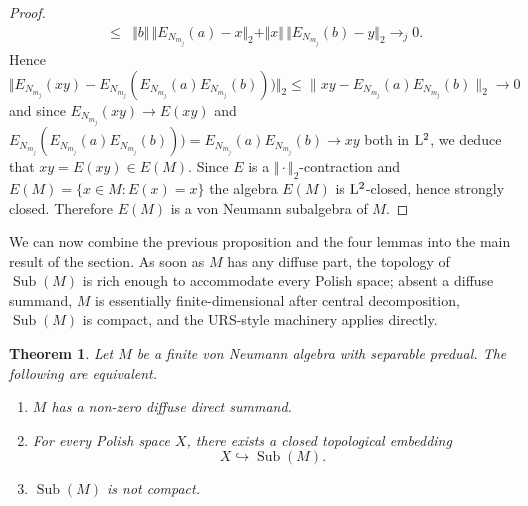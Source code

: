 \documentclass[12pt]{amsart} %
\theoremstyle{plain}
\newtheorem{theorem}{Theorem}[section]
\theoremstyle{definition}
\DeclareMathOperator{\Sub}{Sub}
\begin{document}
\begin{proof}
\begin{eqnarray*}
&\leq &\Vert b\Vert\,\Vert E_{N_{m_j}}(a)-x\Vert_2+\Vert x\Vert\,\Vert E_{N_{m_j}}(b)-y\Vert_2\to_j0.
\end{eqnarray*}
Hence $\Vert E_{N_{m_j}}(xy)-E_{N_{m_j}}(E_{N_{m_j}}(a)E_{N_{m_j}}(b)))\Vert_2\leq\|xy-E_{N_{m_j}}(a)E_{N_{m_j}}(b)\|_2\to 0$ and since $E_{N_{m_j}}(xy)\to E(xy)$ and $E_{N_{m_j}}(E_{N_{m_j}}(a)E_{N_{m_j}}(b)))=E_{N_{m_j}}(a)E_{N_{m_j}}(b)\to xy$ both in ${\rm L}^2$, we deduce that $xy=E(xy)\in E(M)$. Since \(E\) is a $\Vert\cdot\Vert_2$-contraction and $E(M)=\{x\in M:E(x)=x\}$ the algebra $E(M)$ is ${\rm L}^2$-closed, hence strongly closed. Therefore $E(M)$ is a von Neumann subalgebra of \(M\).\end{proof}
We can now combine the previous proposition and the four lemmas into the main result of the section. As soon as $M$ has any diffuse part, the topology of $\Sub(M)$ is rich enough to accommodate every Polish space; absent a diffuse summand, $M$ is essentially finite-dimensional after central decomposition, $\Sub(M)$ is compact, and the URS-style machinery applies directly.
\begin{theorem}
\label{ThmEmbedding}
Let \(M\) be a finite von Neumann algebra with separable predual. The following
are equivalent.
\begin{enumerate}
    \item \(M\) has a non-zero diffuse direct summand.
    \item For every Polish space \(X\), there exists a closed topological embedding
    $$X\hookrightarrow \Sub(M).$$
    \item $\Sub(M)$ is not compact.
\end{enumerate}
\end{theorem}
\end{document}
